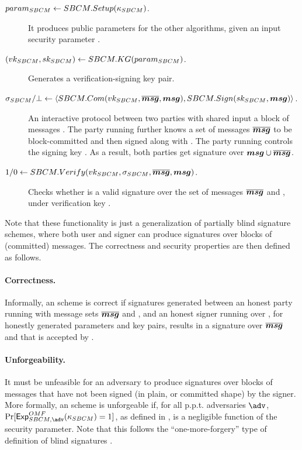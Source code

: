 \begin{description}
\item[$param_{SBCM} \gets SBCM.Setup(\kappa_{SBCM})$.] It produces public parameters
  for the other algorithms, given an input security parameter \SBCMsecpar.
\item[$(vk_{SBCM},sk_{SBCM}) \gets SBCM.KG(param_{SBCM})$.] Generates a
  verification-signing key pair.
\item[$\sigma_{SBCM}/\bot \gets \langle SBCM.Com(vk_{SBCM},\overline{\boldsymbol{msg}},\boldsymbol{msg}),
  SBCM.Sign(sk_{SBCM},\boldsymbol{msg}) \rangle$.] An interactive protocol between two
  parties with shared input a block of messages \smsg. The party running
  \SBCMCom further knows a set of messages $\overline{\boldsymbol{msg}}$ to be
  block-committed and then signed along with \smsg. The party running \SBCMSign
  controls the signing key \SBCMsk. As a result, both parties get signature
  \SBCMsig over $\boldsymbol{msg} \cup \overline{\boldsymbol{msg}}$.
\item[$1/0 \gets SBCM.Verify(vk_{SBCM},\sigma_{SBCM},\overline{\boldsymbol{msg}},\boldsymbol{msg})$.] Checks
  whether \SBCMsig is a valid signature over the set of messages
  $\overline{\boldsymbol{msg}}$ and \smsg, under verification key \SBCMvk.
\end{description}

Note that these functionality is just a generalization of partially blind
signature schemes, where both user and signer can produce signatures over
blocks of (committed) messages. The correctness and security properties are
then defined as follows.

\paragraph{Correctness.} %
Informally, an \SBCM scheme is correct if signatures generated between an honest
party running \SBCMCom with message sets $\overline{\boldsymbol{msg}}$ and \smsg, and an
honest signer running \SBCMSign over \smsg, for honestly generated parameters
and key pairs, results in a signature over $\overline{\boldsymbol{msg}}$ and \smsg that is
accepted by \SBCMVerify. 

\paragraph{Unforgeability.} %
It must be unfeasible for an adversary to produce signatures over blocks of
messages that have not been signed (in plain, or committed shape) by the
signer. More formally, an \SBCM scheme is unforgeable if, for all p.p.t.
adversaries $\adv$, $\Pr[\ExpSBCMOMF(\SBCMsecpar) = 1]$, as defined in
, is a negligible function of the security parameter.
Note that this follows the ``one-more-forgery'' type of definition of blind
signatures \cite{bold02}.

